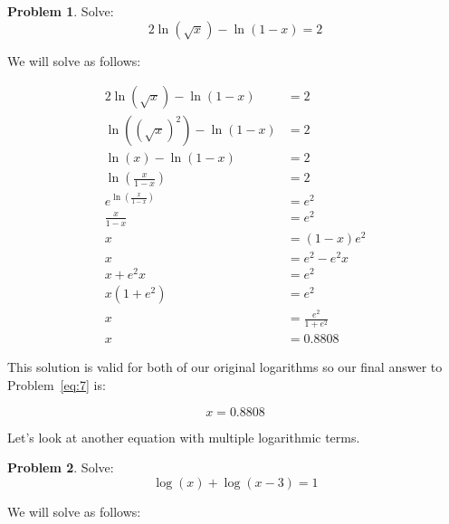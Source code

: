 \documentclass[12pt]{article}
\theoremstyle{definition}
\newtheorem{problem}{Problem}
\begin{document}
\begin{problem}
Solve:
\begin{equation*}
    2\ln(\sqrt{x}) - \ln(1-x) = 2 \label{eq:7}
\end{equation*}
\end{problem}

We will solve as follows:

\begin{align}
    2\ln(\sqrt{x}) - \ln(1-x)         & = 2                 \\
    \ln((\sqrt{x})^2) - \ln(1-x)      & = 2                 \\
    \ln(x) - \ln(1-x)                 & = 2                 \\
    \ln\left(\frac{x}{1-x}\right)     & = 2                 \\
    e^{\ln\left(\frac{x}{1-x}\right)} & = e^2               \\
    \frac{x}{1-x}                     & = e^2               \\
    x                                 & = (1-x)e^2          \\
    x                                 & = e^2 - e^2x        \\
    x + e^2x                          & = e^2               \\
    x(1+e^2)                          & = e^2               \\
    x                                 & = \frac{e^2}{1+e^2} \\
    x                                 & = 0.8808
\end{align}

This solution is valid for both of our original logarithms so our final answer to Problem~\eqref{eq:7} is:

\begin{equation}
    x = 0.8808
\end{equation}

Let's look at another equation with multiple logarithmic terms.

\begin{problem}
Solve:
\begin{equation*}
    \log(x) + \log(x-3) = 1 \label{eq:8}
\end{equation*}
\end{problem}

We will solve as follows:
\end{document}
